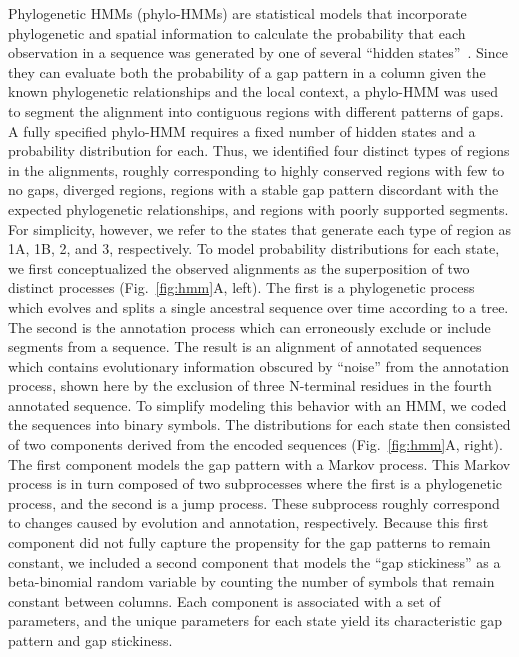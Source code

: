 Phylogenetic HMMs (phylo-HMMs) are statistical models that incorporate phylogenetic and spatial information to calculate the probability that each observation in a sequence was generated by one of several ``hidden states''~\cite{Felsenstein1996}. Since they can evaluate both the probability of a gap pattern in a column given the known phylogenetic relationships and the local context, a phylo-HMM was used to segment the alignment into contiguous regions with different patterns of gaps. A fully specified phylo-HMM requires a fixed number of hidden states and a probability distribution for each. Thus, we identified four distinct types of regions in the alignments, roughly corresponding to highly conserved regions with few to no gaps, diverged regions, regions with a stable gap pattern discordant with the expected phylogenetic relationships, and regions with poorly supported segments. For simplicity, however, we refer to the states that generate each type of region as 1A, 1B, 2, and 3, respectively. To model probability distributions for each state, we first conceptualized the observed alignments as the superposition of two distinct processes (Fig.~\ref{fig:hmm}A, left). The first is a phylogenetic process which evolves and splits a single ancestral sequence over time according to a tree. The second is the annotation process which can erroneously exclude or include segments from a sequence. The result is an alignment of annotated sequences which contains evolutionary information obscured by ``noise'' from the annotation process, shown here by the exclusion of three N-terminal residues in the fourth annotated sequence. To simplify modeling this behavior with an HMM, we coded the sequences into binary symbols. The distributions for each state then consisted of two components derived from the encoded sequences (Fig.~\ref{fig:hmm}A, right). The first component models the gap pattern with a Markov process. This Markov process is in turn composed of two subprocesses where the first is a phylogenetic process, and the second is a jump process. These subprocess roughly correspond to changes caused by evolution and annotation, respectively. Because this first component did not fully capture the propensity for the gap patterns to remain constant, we included a second component that models the ``gap stickiness'' as a beta-binomial random variable by counting the number of symbols that remain constant between columns. Each component is associated with a set of parameters, and the unique parameters for each state yield its characteristic gap pattern and gap stickiness.


